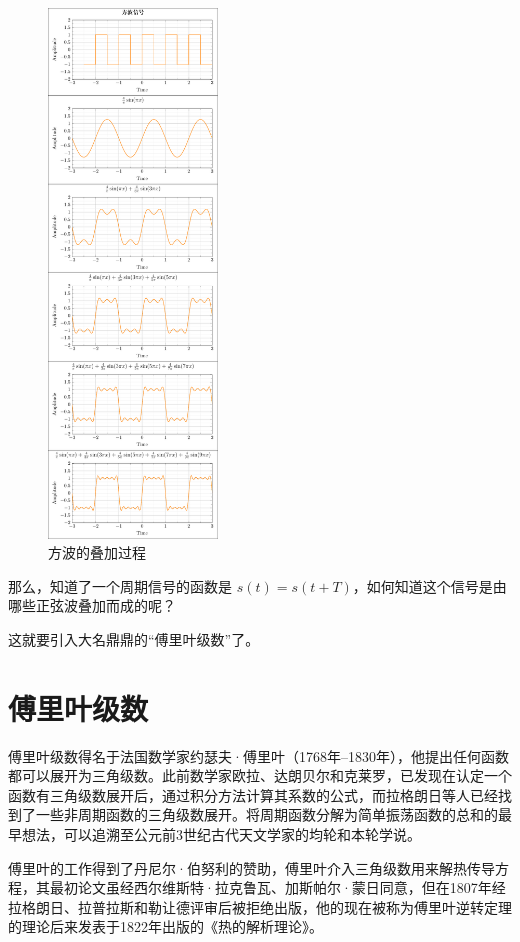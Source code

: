 \documentclass[lang=cn,newtx,10pt,scheme=chinese]{elegantbook}
\begin{document}
\begin{figure}[!htbp]
\centering
\includegraphics[width=0.4\textwidth]{figures/fourier_series_square/figure.pdf}
\caption{方波的叠加过程}
\label{fig:fourier_series_square}
\end{figure}

那么，知道了一个周期信号的函数是 $s(t) = s(t + T)$，如何知道这个信号是由哪些正弦波叠加而成的呢？

这就要引入大名鼎鼎的“傅里叶级数”了。

\section{傅里叶级数}

\begin{marker}
傅里叶级数得名于法国数学家约瑟夫·傅里叶（1768年–1830年），他提出任何函数都可以展开为三角级数。此前数学家欧拉、达朗贝尔和克莱罗，已发现在认定一个函数有三角级数展开后，通过积分方法计算其系数的公式，而拉格朗日等人已经找到了一些非周期函数的三角级数展开。将周期函数分解为简单振荡函数的总和的最早想法，可以追溯至公元前3世纪古代天文学家的均轮和本轮学说。

傅里叶的工作得到了丹尼尔·伯努利的赞助，傅里叶介入三角级数用来解热传导方程，其最初论文虽经西尔维斯特·拉克鲁瓦、加斯帕尔·蒙日同意，但在1807年经拉格朗日、拉普拉斯和勒让德评审后被拒绝出版，他的现在被称为傅里叶逆转定理的理论后来发表于1822年出版的《热的解析理论》。
\end{marker}
\end{document}
